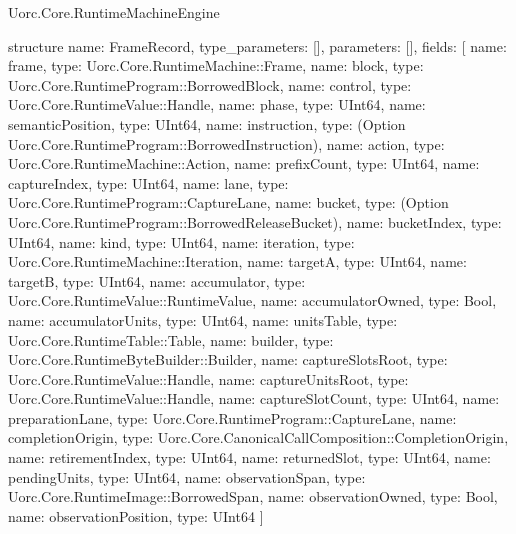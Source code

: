 \begin{lexlean}{Uorc.Core.RuntimeMachineEngine}
\begin{semanticmodule}
structure{
  name: FrameRecord,
  type_parameters: [],
  parameters: [],
  fields: [
    {name: frame, type: Uorc.Core.RuntimeMachine::Frame},
    {name: block, type: Uorc.Core.RuntimeProgram::BorrowedBlock},
    {name: control, type: Uorc.Core.RuntimeValue::Handle},
    {name: phase, type: UInt64},
    {name: semanticPosition, type: UInt64},
    {name: instruction, type: (Option Uorc.Core.RuntimeProgram::BorrowedInstruction)},
    {name: action, type: Uorc.Core.RuntimeMachine::Action},
    {name: prefixCount, type: UInt64},
    {name: captureIndex, type: UInt64},
    {name: lane, type: Uorc.Core.RuntimeProgram::CaptureLane},
    {name: bucket, type: (Option Uorc.Core.RuntimeProgram::BorrowedReleaseBucket)},
    {name: bucketIndex, type: UInt64},
    {name: kind, type: UInt64},
    {name: iteration, type: Uorc.Core.RuntimeMachine::Iteration},
    {name: targetA, type: UInt64},
    {name: targetB, type: UInt64},
    {name: accumulator, type: Uorc.Core.RuntimeValue::RuntimeValue},
    {name: accumulatorOwned, type: Bool},
    {name: accumulatorUnits, type: UInt64},
    {name: unitsTable, type: Uorc.Core.RuntimeTable::Table},
    {name: builder, type: Uorc.Core.RuntimeByteBuilder::Builder},
    {name: captureSlotsRoot, type: Uorc.Core.RuntimeValue::Handle},
    {name: captureUnitsRoot, type: Uorc.Core.RuntimeValue::Handle},
    {name: captureSlotCount, type: UInt64},
    {name: preparationLane, type: Uorc.Core.RuntimeProgram::CaptureLane},
    {name: completionOrigin, type: Uorc.Core.CanonicalCallComposition::CompletionOrigin},
    {name: retirementIndex, type: UInt64},
    {name: returnedSlot, type: UInt64},
    {name: pendingUnits, type: UInt64},
    {name: observationSpan, type: Uorc.Core.RuntimeImage::BorrowedSpan},
    {name: observationOwned, type: Bool},
    {name: observationPosition, type: UInt64}
  ]
}


\end{semanticmodule}
\end{lexlean}
